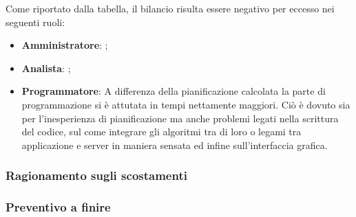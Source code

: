 Come riportato dalla tabella, il bilancio risulta essere negativo per eccesso nei seguenti ruoli:
\begin{itemize}
	\item \textbf{Amministratore}: ;
	\item \textbf{Analista}: ;
	\item \textbf{Programmatore}: A differenza della pianificazione calcolata la parte di programmazione si è attutata in tempi nettamente maggiori. Ciò è dovuto sia per 
	l'inesperienza di pianificazione ma anche problemi legati nella scrittura del codice, sul come integrare gli algoritmi tra di loro o legami tra applicazione e server in 
	maniera sensata ed infine sull'interfaccia grafica.
\end{itemize}
\subsubsection{Ragionamento sugli scostamenti}

\subsubsection{Preventivo a finire}
